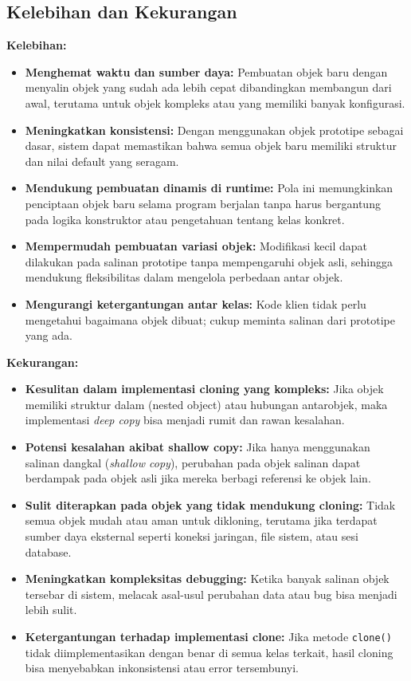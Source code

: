 \subsection{Kelebihan dan Kekurangan}

\textbf{Kelebihan:}
\begin{itemize}
\item \textbf{Menghemat waktu dan sumber daya:} Pembuatan objek baru dengan menyalin objek yang sudah ada lebih cepat dibandingkan membangun dari awal, terutama untuk objek kompleks atau yang memiliki banyak konfigurasi.

\item \textbf{Meningkatkan konsistensi:} Dengan menggunakan objek prototipe sebagai dasar, sistem dapat memastikan bahwa semua objek baru memiliki struktur dan nilai default yang seragam.

\item \textbf{Mendukung pembuatan dinamis di runtime:} Pola ini memungkinkan penciptaan objek baru selama program berjalan tanpa harus bergantung pada logika konstruktor atau pengetahuan tentang kelas konkret.

\item \textbf{Mempermudah pembuatan variasi objek:} Modifikasi kecil dapat dilakukan pada salinan prototipe tanpa mempengaruhi objek asli, sehingga mendukung fleksibilitas dalam mengelola perbedaan antar objek.

\item \textbf{Mengurangi ketergantungan antar kelas:} Kode klien tidak perlu mengetahui bagaimana objek dibuat; cukup meminta salinan dari prototipe yang ada.
\end{itemize}

\textbf{Kekurangan:}
\begin{itemize}
\item \textbf{Kesulitan dalam implementasi cloning yang kompleks:} Jika objek memiliki struktur dalam (nested object) atau hubungan antarobjek, maka implementasi \textit{deep copy} bisa menjadi rumit dan rawan kesalahan.

\item \textbf{Potensi kesalahan akibat shallow copy:} Jika hanya menggunakan salinan dangkal (\textit{shallow copy}), perubahan pada objek salinan dapat berdampak pada objek asli jika mereka berbagi referensi ke objek lain.

\item \textbf{Sulit diterapkan pada objek yang tidak mendukung cloning:} Tidak semua objek mudah atau aman untuk dikloning, terutama jika terdapat sumber daya eksternal seperti koneksi jaringan, file sistem, atau sesi database.

\item \textbf{Meningkatkan kompleksitas debugging:} Ketika banyak salinan objek tersebar di sistem, melacak asal-usul perubahan data atau bug bisa menjadi lebih sulit.

\item \textbf{Ketergantungan terhadap implementasi clone:} Jika metode \texttt{clone()} tidak diimplementasikan dengan benar di semua kelas terkait, hasil cloning bisa menyebabkan inkonsistensi atau error tersembunyi.
\end{itemize}


